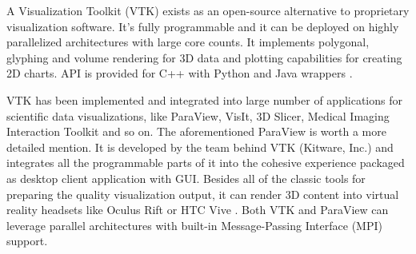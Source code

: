 A Visualization Toolkit (VTK) exists as an open-source alternative to proprietary visualization software. It's fully programmable and it can be deployed on highly parallelized architectures with large core counts. It implements polygonal, glyphing and volume rendering for 3D data and plotting capabilities for creating 2D charts. API is provided for C++ with Python and Java wrappers \citep{hanwellVisualizationToolkitVTK2015}.

VTK has been implemented and integrated into large number of applications for scientific data visualizations, like ParaView, VisIt, 3D Slicer, Medical Imaging Interaction Toolkit and so on. The aforementioned ParaView is worth a more detailed mention. It is developed by the team behind VTK (Kitware, Inc.) and integrates all the programmable parts of it into the cohesive experience packaged as desktop client application with GUI. Besides all of the classic tools for preparing the quality visualization output, it can render 3D content into virtual reality headsets like Oculus Rift or HTC Vive \citep{paraview2005}. Both VTK and ParaView can leverage parallel architectures with built-in Message-Passing Interface (MPI) support.





